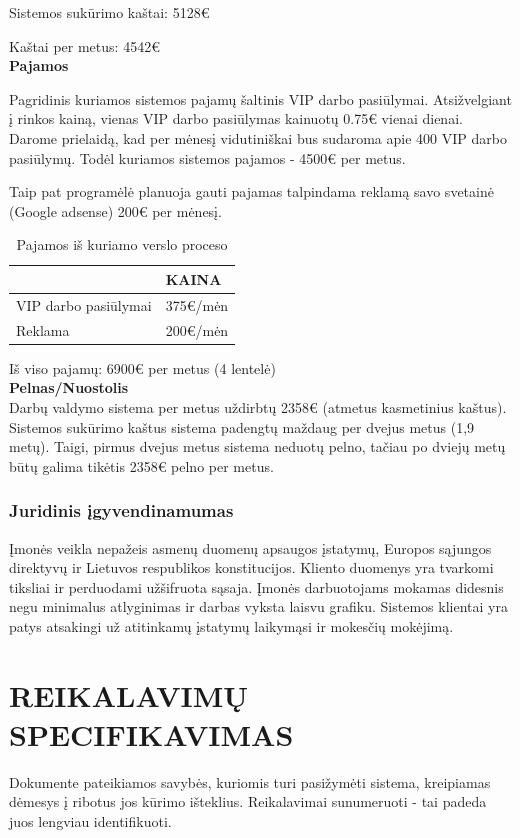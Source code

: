 \documentclass{VUMIFPSkursinis}
\begin{document}
Sistemos sukūrimo kaštai: 5128€

Kaštai per metus: 4542€\\ 

\textbf{Pajamos}

Pagridinis kuriamos sistemos pajamų šaltinis VIP darbo pasiūlymai. Atsižvelgiant į rinkos kainą, vienas VIP darbo pasiūlymas kainuotų 0.75€ vienai dienai. Darome prielaidą, kad per mėnesį vidutiniškai bus sudaroma apie 400 VIP darbo pasiūlymų. Todėl kuriamos sistemos pajamos  - 4500€ per metus.

Taip pat programėlė planuoja gauti pajamas talpindama reklamą savo svetainė (Google adsense) 200€ per mėnesį.
\begin{table}[H]
\caption{Pajamos iš kuriamo verslo proceso}
\centering
\normalsize
\begin{tabular}{|p{8cm}|p{4cm}|}
\hline
\rowcolor{gray!40}
\multicolumn{1}{|m{8cm}|}{\textbf{IŠLAIDOS}}&\multicolumn{1}{m{4cm}|}{\textbf{KAINA}}\\ \hline
\multicolumn{1}{|m{8cm}|}{VIP darbo pasiūlymai}&\multicolumn{1}{m{4cm}|}{375€/mėn}\\ \hline
\multicolumn{1}{|m{8cm}|}{Reklama}&\multicolumn{1}{m{4cm}|}{200€/mėn}\\ \hline
\end{tabular}
\end{table}
Iš viso pajamų: 6900€ per metus  (4 lentelė)\\

\textbf{Pelnas/Nuostolis}\\
Darbų valdymo sistema per metus uždirbtų 2358€  (atmetus kasmetinius kaštus). Sistemos sukūrimo kaštus sistema padengtų maždaug per dvejus metus (1,9 metų). Taigi, pirmus dvejus metus sistema neduotų pelno, tačiau po dviejų metų būtų galima tikėtis 2358€ pelno per metus.
\subsubsection{Juridinis įgyvendinamumas}
Įmonės veikla nepažeis asmenų duomenų apsaugos įstatymų, Europos sąjungos direktyvų ir Lietuvos respublikos konstitucijos. Kliento duomenys yra tvarkomi tiksliai ir perduodami užšifruota sąsaja. Įmonės darbuotojams mokamas didesnis negu minimalus atlyginimas ir darbas vyksta laisvu grafiku. Sistemos klientai yra patys atsakingi už atitinkamų įstatymų laikymąsi ir mokesčių mokėjimą.
\newpage
\section{REIKALAVIMŲ SPECIFIKAVIMAS}
Dokumente pateikiamos savybės, kuriomis turi pasižymėti sistema, kreipiamas dėmesys į ribotus jos kūrimo išteklius. Reikalavimai sunumeruoti - tai padeda juos lengviau identifikuoti.
\end{document}
